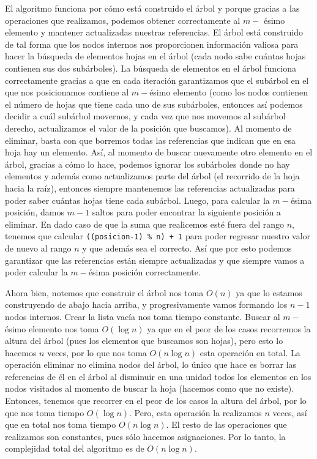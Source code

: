 \documentclass[letterpaper,11pt]{article}
\begin{document}
\begin{enumerate}
\begin{enumerate}
        El algoritmo funciona por cómo está construido el árbol y porque gracias 
        a las operaciones que realizamos, podemos obtener correctamente al 
        $m-$ ésimo elemento y mantener actualizadas nuestras referencias. El 
        árbol está construido de tal forma que los nodos internos nos 
        proporcionen información valiosa para hacer la búsqueda de elementos 
        hojas en el árbol (cada nodo sabe cuántas hojas contienen sus dos 
        subárboles). La búsqueda de elementos en el árbol funciona correctamente 
        gracias a que en cada iteración garantizamos que el subárbol en el que 
        nos posicionamos contiene al $m-$ésimo elemento (como los nodos contienen 
        el número de hojas que tiene cada uno de sus subárboles, entonces así 
        podemos decidir a cuál subárbol movernos, y cada vez que nos movemos al 
        subárbol derecho, actualizamos el valor de la posición que buscamos). 
        Al momento de eliminar, basta con que borremos todas las referencias 
        que indican que en esa hoja hay un elemento. Así, al momento de buscar 
        nuevamente otro elemento en el árbol, gracias a cómo lo hace, podemos 
        ignorar los subárboles donde no hay elementos y además como actualizamos 
        parte del árbol (el recorrido de la hoja hacia la raíz), entonces siempre 
        mantenemos las referencias actualizadas para poder saber cuántas hojas 
        tiene cada subárbol. Luego, para calcular la $m-$ésima posición, damos 
        $m-1$ saltos para poder encontrar la siguiente posición a eliminar. En 
        dado caso de que la suma que realicemos esté fuera del rango $n$, 
        tenemos que calcular \texttt{((posicion-1) \% n) + 1} para poder 
        regresar nuestro valor de nuevo al rango $n$ y que además sea el 
        correcto. Así que por esto podemos garantizar que las referencias están 
        siempre actualizadas y que siempre vamos a poder calcular la $m-$ésima 
        posición correctamente.

        Ahora bien, notemos que construir el árbol nos toma $O(n)$ ya que lo 
        estamos construyendo de abajo hacia arriba, y progresivamente vamos 
        formando los $n-1$ nodos internos. Crear la lista vacía nos toma tiempo 
        constante. Buscar al $m-$ésimo elemento nos toma $O(\log n)$ ya que en 
        el peor de los casos recorremos la altura del árbol (pues los elementos 
        que buscamos son hojas), pero esto lo hacemos $n$ veces, por lo que nos 
        toma $O(n \log n)$ esta operación en total. La operación eliminar no 
        elimina nodos del árbol, lo único que hace es borrar las referencias 
        de él en el árbol al disminuir en una unidad todos los elementos en los 
        nodos visitados al momento de buscar la hoja (hacemos como que no 
        existe). Entonces, tenemos que recorrer en el peor de los casos la 
        altura del árbol, por lo que nos toma tiempo $O(\log n)$. Pero, esta 
        operación la realizamos $n$ veces, así que en total nos toma tiempo 
        $O(n \log n)$. El resto de las operaciones que realizamos son constantes, 
        pues sólo hacemos asignaciones. Por lo tanto, la complejidad total del 
        algoritmo es de $O(n \log n)$.


\end{enumerate}
\end{enumerate}
\end{document}
